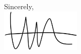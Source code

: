 \documentclass[12pt, a4paper]{letter} %
\begin{document}
\begin{letter}{

}
\closing{Sincerely, \\
  \hbox{\hspace{-10cm}}
\includegraphics[height=2cm]{mkl_sig.pdf}  
}





\end{letter}
\end{document}
